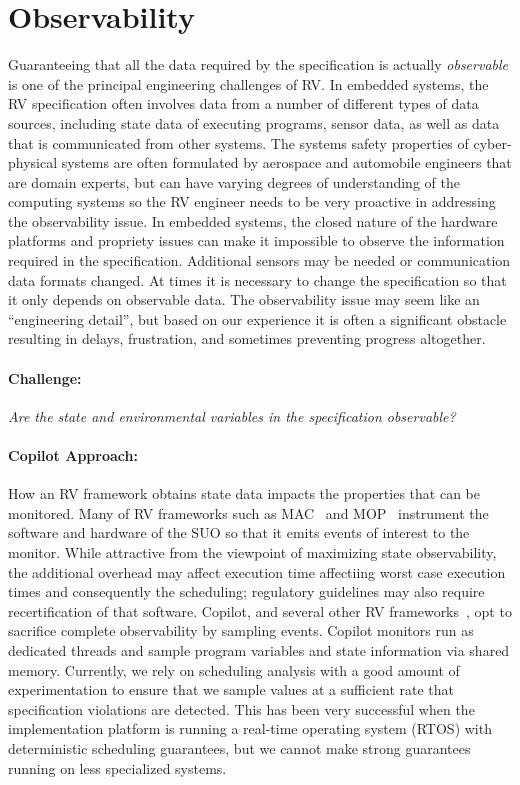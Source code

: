 \section{Observability}\label{sec:observ} 
Guaranteeing that all the data required by the specification is
actually \emph{observable} is one of the principal engineering
challenges of RV. In embedded systems, the RV specification often
involves data from a number of different types of data sources,
including state data of executing programs, sensor data, as well as
data that is communicated from other systems.  The systems safety
properties of cyber-physical systems are often formulated by aerospace
and automobile engineers that are domain experts, but can have
varying degrees of understanding of the computing systems so the RV
engineer needs to be very proactive in addressing the observability
issue. In embedded systems, the closed nature of the hardware
platforms and propriety issues can make it impossible to observe the
information required in the specification.  Additional sensors may be
needed or communication data formats changed.  At times it is
necessary to change the specification so that it only depends on
observable data.  The observability issue may seem like an
``engineering detail'', but based on our experience it is often a
significant obstacle resulting in  delays, frustration, and sometimes
preventing progress altogether.


\paragraph{Challenge:} \emph{Are the state and environmental variables in the
specification  observable?}  


  \paragraph{Copilot Approach:} How an RV framework obtains state data impacts the properties that
  can be monitored. Many of RV frameworks such as MAC~\cite{KimLKS04}
  and MOP~\cite{ChenR05} instrument the software and hardware of the
  SUO so that it emits events of interest to the monitor.  While
  attractive from the viewpoint of maximizing state observability, the
  additional overhead may affect execution time affectiing worst case
  execution times and consequently the scheduling; 
  regulatory guidelines may  also require recertification of that software.
  Copilot, and several other RV frameworks~\cite{sampling,Kane15,borzoo}, opt to sacrifice complete
  observability by sampling events.  Copilot monitors run as dedicated
  threads and sample program variables and state information via shared
  memory.  Currently, we rely on scheduling analysis with a good
  amount of experimentation to ensure that we sample values at a
  sufficient rate that specification violations are detected. This has
  been very successful when the implementation platform is running a
  real-time operating system (RTOS) with deterministic scheduling
  guarantees, but we cannot make strong guarantees running on less
  specialized systems.

